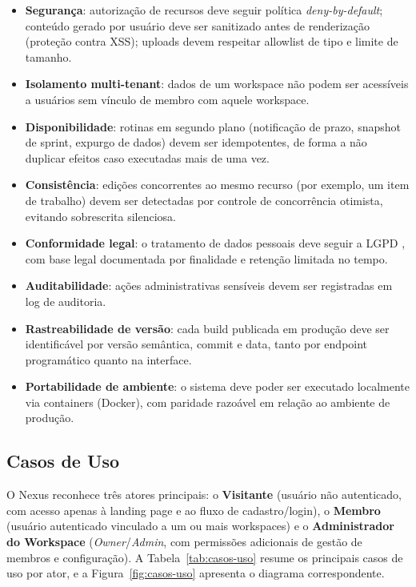 \documentclass[12pt]{article}
\begin{document}
\begin{itemize}
  \item[RNF01] \textbf{Segurança}: autorização de recursos deve seguir política \emph{deny-by-default}; conteúdo gerado por usuário deve ser sanitizado antes de renderização (proteção contra XSS); uploads devem respeitar allowlist de tipo e limite de tamanho.
  \item[RNF02] \textbf{Isolamento multi-tenant}: dados de um workspace não podem ser acessíveis a usuários sem vínculo de membro com aquele workspace.
  \item[RNF03] \textbf{Disponibilidade}: rotinas em segundo plano (notificação de prazo, snapshot de sprint, expurgo de dados) devem ser idempotentes, de forma a não duplicar efeitos caso executadas mais de uma vez.
  \item[RNF04] \textbf{Consistência}: edições concorrentes ao mesmo recurso (por exemplo, um item de trabalho) devem ser detectadas por controle de concorrência otimista, evitando sobrescrita silenciosa.
  \item[RNF05] \textbf{Conformidade legal}: o tratamento de dados pessoais deve seguir a LGPD \cite{lgpd}, com base legal documentada por finalidade e retenção limitada no tempo.
  \item[RNF06] \textbf{Auditabilidade}: ações administrativas sensíveis devem ser registradas em log de auditoria.
  \item[RNF07] \textbf{Rastreabilidade de versão}: cada build publicada em produção deve ser identificável por versão semântica, commit e data, tanto por endpoint programático quanto na interface.
  \item[RNF08] \textbf{Portabilidade de ambiente}: o sistema deve poder ser executado localmente via containers (Docker), com paridade razoável em relação ao ambiente de produção.
\end{itemize}

\subsection{Casos de Uso}

O Nexus reconhece três atores principais: o \textbf{Visitante} (usuário não autenticado, com acesso apenas à landing page e ao fluxo de cadastro/login), o \textbf{Membro} (usuário autenticado vinculado a um ou mais workspaces) e o \textbf{Administrador do Workspace} (\emph{Owner}/\emph{Admin}, com permissões adicionais de gestão de membros e configuração). A Tabela~\ref{tab:casos-uso} resume os principais casos de uso por ator, e a Figura~\ref{fig:casos-uso} apresenta o diagrama correspondente.
\end{document}
